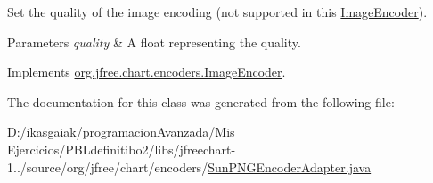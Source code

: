 Set the quality of the image encoding (not supported in this \mbox{\hyperlink{interfaceorg_1_1jfree_1_1chart_1_1encoders_1_1_image_encoder}{Image\+Encoder}}).


\begin{DoxyParams}{Parameters}
{\em quality} & A float representing the quality. \\
\hline
\end{DoxyParams}


Implements \mbox{\hyperlink{interfaceorg_1_1jfree_1_1chart_1_1encoders_1_1_image_encoder_a143bbe40d39b16192a92128696877782}{org.\+jfree.\+chart.\+encoders.\+Image\+Encoder}}.



The documentation for this class was generated from the following file\+:\begin{DoxyCompactItemize}
\item 
D\+:/ikasgaiak/programacion\+Avanzada/\+Mis Ejercicios/\+P\+B\+Ldefinitibo2/libs/jfreechart-\/1../source/org/jfree/chart/encoders/\mbox{\hyperlink{_sun_p_n_g_encoder_adapter_8java}{Sun\+P\+N\+G\+Encoder\+Adapter.\+java}}\end{DoxyCompactItemize}
